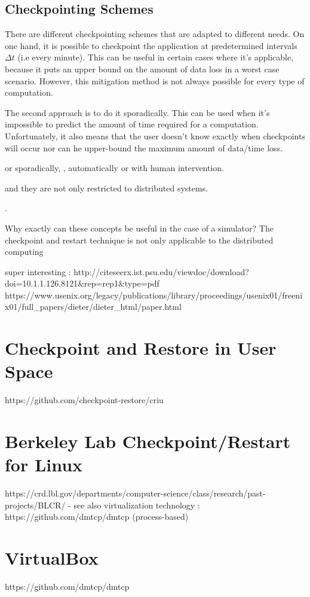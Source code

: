 {\subsection*{Checkpointing Schemes}
There are different checkpointing schemes that are adapted to different needs. On one hand, it is possible to checkpoint the application at predetermined intervals $\Delta t$ (i.e every minute). This can be useful in certain cases where it's applicable, because it puts an upper bound on the amount of data loss in a worst case scenario. However, this mitigation method is not always possible for every type of computation. 

The second approach is to do it sporadically. This can be used when it's impossible to predict the amount of time required for a computation. Unfortunately, it also means that the user doesn't know exactly when checkpoints will occur nor can he upper-bound the maximum amount of data/time loss.

 or sporadically, , automatically or with human intervention.

 and they are not only restricted to distributed systems. 

.

Why exactly can these concepts be useful in the case of a simulator? The checkpoint and restart technique is not only applicable to the distributed computing 

super interesting : http://citeseerx.ist.psu.edu/viewdoc/download?doi=10.1.1.126.8121&rep=rep1&type=pdf
https://www.usenix.org/legacy/publications/library/proceedings/usenix01/freenix01/full_papers/dieter/dieter_html/paper.html
\section{Checkpoint and Restore in User Space}\label{sec:criu}
https://github.com/checkpoint-restore/criu
\section{Berkeley Lab Checkpoint/Restart for Linux}\label{sec:blcr}
https://crd.lbl.gov/departments/computer-science/class/research/past-projects/BLCR/
- see also virtualization technology : https://github.com/dmtcp/dmtcp (process-based)
\section{VirtualBox}\label{sec:virtualbox}

https://github.com/dmtcp/dmtcp
}